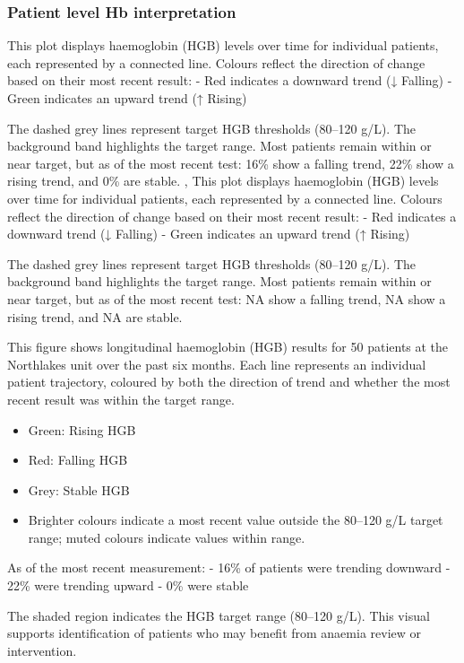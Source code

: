 \documentclass[
]{article}
\providecommand{\tightlist}{%
  \setlength{\itemsep}{0pt}\setlength{\parskip}{0pt}}
\begin{document}
\subsubsection{Patient level Hb
interpretation}\label{patient-level-hb-interpretation}

This plot displays haemoglobin (HGB) levels over time for individual
patients, each represented by a connected line. Colours reflect the
direction of change based on their most recent result: - Red indicates a
downward trend (↓ Falling) - Green indicates an upward trend (↑ Rising)

The dashed grey lines represent target HGB thresholds (80--120 g/L). The
background band highlights the target range. Most patients remain within
or near target, but as of the most recent test: 16\% show a falling
trend, 22\% show a rising trend, and 0\% are stable. , This plot
displays haemoglobin (HGB) levels over time for individual patients,
each represented by a connected line. Colours reflect the direction of
change based on their most recent result: - Red indicates a downward
trend (↓ Falling) - Green indicates an upward trend (↑ Rising)

The dashed grey lines represent target HGB thresholds (80--120 g/L). The
background band highlights the target range. Most patients remain within
or near target, but as of the most recent test: NA show a falling trend,
NA show a rising trend, and NA are stable.

This figure shows longitudinal haemoglobin (HGB) results for 50 patients
at the Northlakes unit over the past six months. Each line represents an
individual patient trajectory, coloured by both the direction of trend
and whether the most recent result was within the target range.

\begin{itemize}
\tightlist
\item
  Green: Rising HGB
\item
  Red: Falling HGB
\item
  Grey: Stable HGB
\item
  Brighter colours indicate a most recent value outside the 80--120 g/L
  target range; muted colours indicate values within range.
\end{itemize}

As of the most recent measurement: - 16\% of patients were trending
downward - 22\% were trending upward - 0\% were stable

The shaded region indicates the HGB target range (80--120 g/L). This
visual supports identification of patients who may benefit from anaemia
review or intervention.
\end{document}
